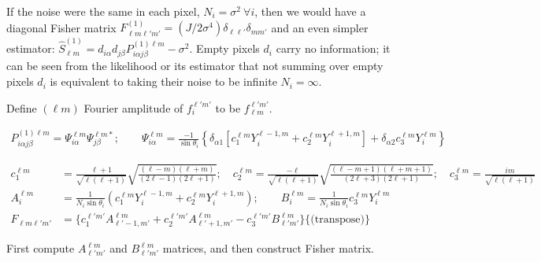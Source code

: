 \documentclass[prd,aps,10pt,nofootinbib,twocolumn,superscriptaddress,preprintnumbers,balancelastpage,longbibliography]{revtex4-1}
\begin{document}
If the noise were the same in each pixel, $N_i = \sigma^2~ \forall i$, then we would have a diagonal Fisher matrix $F^{(1)}_{\ell m \ell' m'} = (J/2\sigma^4)\delta_{\ell \ell'} \delta_{m m'}$ and an even simpler estimator: $\hat{S}^{(1)}_{\ell m} = d_{i \alpha} d_{j \beta} P^{(1)\ell m}_{i \alpha j \beta} - \sigma^2$. Empty pixels $d_i$ carry no information; it can be seen from the likelihood or its estimator that not summing over empty pixels $d_i$ is equivalent to taking their noise to be infinite $N_i = \infty$.

Define $(\ell m)$ Fourier amplitude of $f^{\ell' m'}_i$ to be $f_{\ell m}^{\ell' m'}$. 
\begin{widetext}
\begin{align}
P^{(1) \ell m}_{i\alpha j \beta} = \Psi^{\ell m}_{i\alpha} \Psi^{\ell m *}_{j \beta}; \qquad 
\Psi^{\ell m}_{i \alpha} = \frac{-1}{\sin \theta_i} \left\lbrace \delta_{\alpha 1} \left[ c^{\ell m}_1 Y^{\ell-1, m}_i + c^{\ell m}_2 Y^{\ell+1, m}_i \right] + \delta_{\alpha 2} c^{\ell m}_3 Y^{\ell m}_i \right\rbrace 
\end{align}
\end{widetext}

\begin{widetext}
\begin{align}
c^{\ell m}_1 &= \frac{\ell + 1}{\sqrt{\ell(\ell+1)}} \sqrt{\frac{(\ell - m)(\ell + m)}{(2\ell -1)(2\ell +1)}}; \quad
c^{\ell m}_2 = \frac{-\ell}{\sqrt{\ell(\ell+1)}} \sqrt{\frac{(\ell - m+1)(\ell + m+1)}{(2\ell +3)(2\ell +1)}}; \quad
c^{\ell m}_3 = \frac{i m}{\sqrt{\ell(\ell+1)}} \\
A^{\ell m}_i &= \frac{1}{N_i \sin \theta_i} \left( c^{\ell m}_1 Y^{\ell-1,m}_i + c^{\ell m}_2 Y^{\ell+1,m}_i \right); \qquad 
B^{\ell m}_i = \frac{1}{N_i \sin \theta_i} c^{\ell m}_3 Y^{\ell m}_i\\ 
F_{\ell m \ell' m'} &=  \big\lbrace c^{\ell' m'}_1 A^{\ell m}_{\ell'-1,m'} + c^{\ell' m'}_2 A^{\ell m}_{\ell'+1,m'} - c^{\ell' m'}_3 B^{\ell m}_{\ell' m'} \big\rbrace \big\lbrace \text{(transpose)} \big\rbrace
\end{align}
\end{widetext}

First compute $A^{\ell m}_{\ell' m'}$ and $B^{\ell m}_{\ell' m'}$ matrices, and then construct Fisher matrix.

\end{document}
